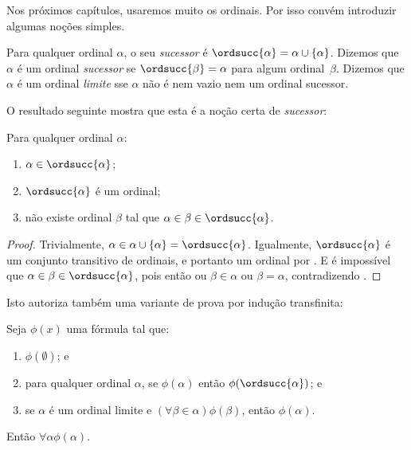 \documentclass[../../../include/open-logic-section]{subfiles}
\begin{document}

Nos próximos capítulos, usaremos muito os ordinais. Por isso convém
introduzir algumas noções simples.

\begin{defn}
Para qualquer ordinal $\alpha$, o seu \emph{sucessor} é $\ordsucc{\alpha}
=\alpha \cup \{\alpha\}$. Dizemos que $\alpha$ é um ordinal
\emph{sucessor} se $\ordsucc{\beta} = \alpha$ para algum ordinal~$\beta$.
Dizemos que $\alpha$ é um ordinal \emph{limite} sse $\alpha$ não é nem
vazio nem um ordinal sucessor.
\end{defn}
\noindent
O resultado seguinte mostra que esta é a noção certa de
\emph{sucessor}:

\begin{prop}
Para qualquer ordinal $\alpha$:
\begin{enumerate}
	\item $\alpha \in \ordsucc{\alpha}$;
	\item $\ordsucc{\alpha}$ é um ordinal;
	\item não existe ordinal $\beta$ tal que $\alpha \in \beta \in
	\ordsucc{\alpha}$.
	\end{enumerate}
\end{prop}

\begin{proof}
Trivialmente, $\alpha \in \alpha \cup \{\alpha\} = \ordsucc{\alpha}$.
Igualmente, $\ordsucc{\alpha}$ é um conjunto transitivo de ordinais, e
portanto um ordinal por .
E é impossível que $\alpha \in \beta \in \ordsucc{\alpha}$,
pois então ou $\beta \in \alpha$ ou $\beta = \alpha$,
contradizendo .
\end{proof}
\noindent
Isto autoriza também uma variante de prova por indução transfinita:

\begin{thm}
Seja $\phi(x)$ uma fórmula tal que:
\begin{enumerate}
	\item $\phi(\emptyset)$; e
	\item para qualquer ordinal $\alpha$, se $\phi(\alpha)$ então
	$\phi(\ordsucc{\alpha})$; e 
	\item se $\alpha$ é um ordinal limite e $(\forall \beta \in
	\alpha)\phi(\beta)$, então $\phi(\alpha)$.
\end{enumerate}
Então $\forall \alpha \phi(\alpha)$.
\end{thm}
\end{document}
